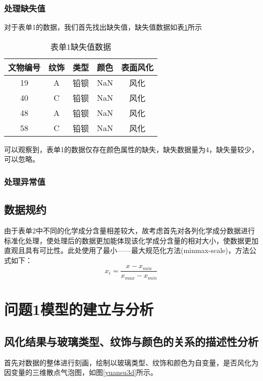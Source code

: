 \documentclass[withoutpreface,bwprint]{cumcmthesis} %
\begin{document}
\subsubsection{处理缺失值}
对于表单1的数据，我们首先找出缺失值，缺失值数据如表\ref{queshi}所示

\begin{table}[!h]
	\centering
	\caption{表单1缺失值数据}
	\label{queshi}
	\begin{tabular}{@{}ccccc@{}}
		\toprule
		\textbf{文物编号} & \textbf{纹饰} & \textbf{类型} & \textbf{颜色} & \textbf{表面风化} \\ \midrule
		19            & A           & 铅钡          & NaN         & 风化            \\
		40            & C           & 铅钡          & NaN         & 风化            \\
		48            & A           & 铅钡          & NaN         & 风化            \\
		58            & C           & 铅钡          & NaN         & 风化            \\ \bottomrule
	\end{tabular}
\end{table}

可以观察到，表单1的数据仅存在颜色属性的缺失，缺失数据量为4，缺失量较少，可以忽略。

\subsubsection{处理异常值}

\subsection{数据规约}
由于表单2中不同的化学成分含量相差较大，故考虑首先对各列化学成分数据进行标准化处理，使处理后的数据更加能体现该化学成分含量的相对大小，使数据更加直观且具有可比性。此处使用了最小——最大规范化方法(minmax-scale)，方法公式如下： $$ x_{i} = \frac{x-x_{min}}{x_{max}-x_{min}}$$


\section{问题1模型的建立与分析}
\subsection{风化结果与玻璃类型、纹饰与颜色的关系的描述性分析}
首先对数据的整体进行刻画，绘制以玻璃类型、纹饰和颜色为自变量，是否风化为因变量的三维散点气泡图，如图\ref{yuansu3d}所示。
\end{document}

